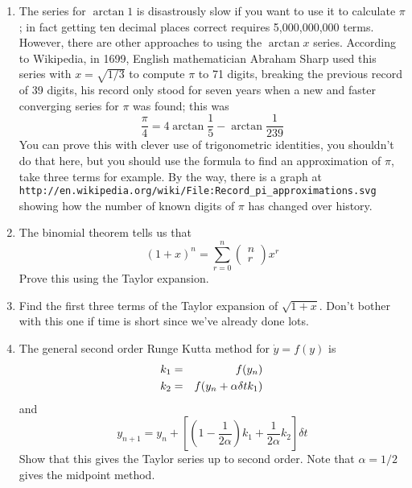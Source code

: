 \documentclass[12pt]{article}
\begin{document}
\begin{enumerate}
\item The series for $\arctan{1}$ is disastrously slow if you want to
  use it to calculate $\pi$; in fact getting ten decimal places
  correct requires 5,000,000,000 terms. However, there are other
  approaches to using the $\arctan{x}$ series. According to Wikipedia,
  in 1699, English mathematician Abraham Sharp used this series with
  $x=\sqrt{1/3} $ to compute $\pi$ to 71 digits, breaking the previous
  record of 39 digits, his record only stood for seven years when a
  new and faster converging series for $\pi$ was found; this was
\begin{equation}
\frac{\pi}{4}=4\arctan{\frac{1}{5}}-\arctan{\frac{1}{239}}
\end{equation}
You can prove this with clever use of trigonometric identities, you
shouldn't do that here, but you should use the formula to find an
approximation of $\pi$, take three terms for example. By the way,
there is a graph
at\\ \texttt{http://en.wikipedia.org/wiki/File:Record\_pi\_approximations.svg}\\ showing
how the number of known digits of $\pi$ has changed over history.


\item The binomial theorem tells us that
\begin{equation}
(1+x)^n=\sum_{r=0}^n \left(\begin{array}{c}n\\r\end{array}\right)x^r
\end{equation}
Prove this using the Taylor expansion.

\item Find the first three terms of the Taylor expansion of $\sqrt{1+x}$. Don't bother with this one if time is short since we've already done lots.

\item The general second order Runge Kutta method for $\dot{y}=f(y)$ is
\begin{eqnarray}
k_1&=&f(y_n)\cr
k_2&=&f(y_n+\alpha \delta t k_1)
\end{eqnarray}
and
\begin{equation}
y_{n+1}=y_n+\left[\left(1-\frac{1}{2\alpha}\right)k_1+\frac{1}{2\alpha}k_2\right]\delta t
\end{equation}
Show that this gives the Taylor series up to second order. Note that
$\alpha=1/2$ gives the midpoint method.

\end{enumerate}
\end{document}
